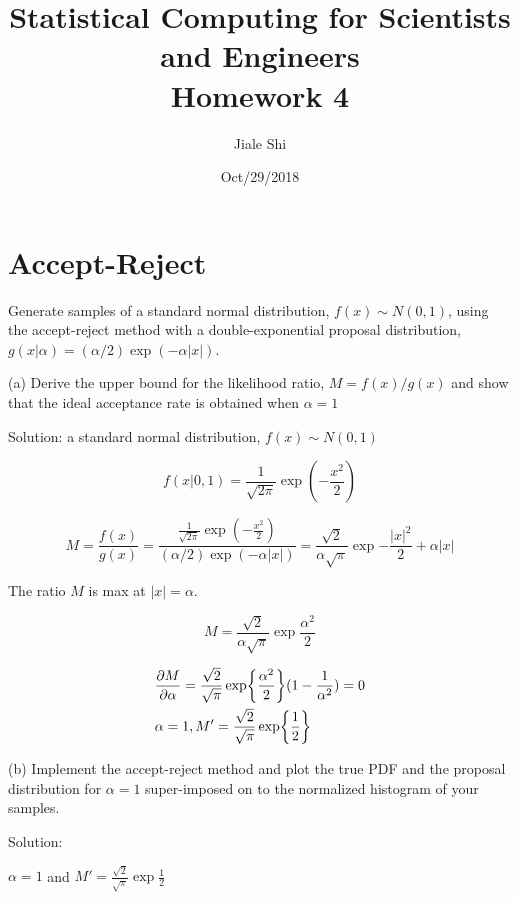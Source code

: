 \documentclass{article}
\title{Statistical Computing for Scientists and Engineers\\[1em] Homework 4}
\author{Jiale Shi}
\date{Oct/29/2018}
\begin{document}
\maketitle

\newpage
\section{Accept-Reject}
Generate samples of a standard normal distribution, $f(x) \sim N(0,1)$, using the accept-reject method with a double-exponential proposal distribution, $g(x|\alpha) = (\alpha/2)\exp(-\alpha |x|)$.

(a) Derive the upper bound for the likelihood ratio, $M=f(x)/g(x)$ and show that the ideal acceptance rate is obtained when $\alpha=1$

Solution:
a standard normal distribution, $f(x) \sim N(0,1)$

\begin{equation}
    f(x|0,1) = \frac{1}{\sqrt{2\pi}}\exp(-\frac{x^2}{2})
\end{equation}

\begin{equation}
    M = \frac{f(x)}{g(x)} = \frac{\frac{1}{\sqrt{2\pi}}\exp(-\frac{x^2}{2})}{(\alpha/2)\exp(-\alpha |x|)} = \frac{\sqrt{2}}{\alpha \sqrt{\pi}} \exp{-\frac{|x|^2}{2}+\alpha |x|}
\end{equation}

The ratio $M$ is max at $|x|=\alpha$.

\begin{equation}
    M =  \frac{\sqrt{2}}{\alpha \sqrt{\pi}} \exp{\frac{\alpha^2}{2}}
\end{equation}

\begin{equation}
\begin{aligned}
    &\pdv{M}{\alpha} = \frac{\sqrt{2}}{\sqrt{\pi}} \exp{\frac{\alpha^2}{2}} (1-\frac{1}{\alpha^2}) = 0 \\
    & \alpha = 1, M' = \frac{\sqrt{2}}{\sqrt{\pi}} \exp{\frac{1}{2}}
\end{aligned}
\end{equation}

(b) Implement the accept-reject method and plot the true PDF and the proposal distribution for $\alpha=1$ super-imposed on to the normalized histogram of your samples.

Solution:

$\alpha = 1$ and 
$M' = \frac{\sqrt{2}}{\sqrt{\pi}} \exp{\frac{1}{2}}$
    
\end{document}
